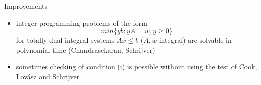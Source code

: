 \documentclass{beamer}
\begin{document}
\begin{frame}

	\begin{block}{Improvements} 

		\begin{itemize}

			\item integer programming problems of the form \begin{equation*} min \{yb: yA=w, y\geq 0 \}\end{equation*} for totally dual integral systems $Ax \leq b$ ($A, w$ integral) are solvable in polynomial time (Chandrasekaran, Schrijver)

			\item sometimes checking of condition (i) is possible without using the test of Cook, Lovász and Schrijver

		\end{itemize}

	\end{block}

\end{frame}
\end{document}

